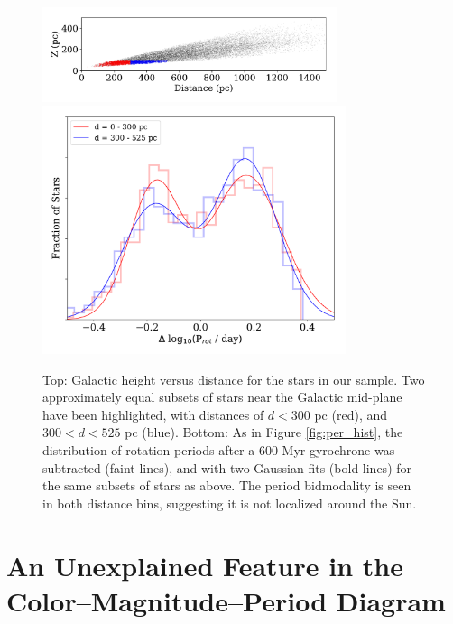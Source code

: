 \documentclass[trackchanges,preprint2]{aastex62}
\begin{document}
\begin{figure}[!ht]
\centering
\includegraphics[width=3.4in]{fig5a}
\includegraphics[width=3.5in]{fig5b}
\caption{
Top: Galactic height versus distance for the stars in our sample. Two approximately equal subsets of stars near the Galactic mid-plane have been highlighted, with distances of $d<300$ pc (red), and $300<d<525$ pc (blue).
Bottom: As in Figure \ref{fig:per_hist}, the distribution of rotation periods after a 600 Myr gyrochrone was subtracted (faint lines), and with two-Gaussian fits (bold lines) for the same subsets of stars as above. The period bidmodality is seen in both distance bins, suggesting it is not localized around the Sun.
}
\label{fig:dZ}
\end{figure}




\section{An Unexplained Feature in the Color--Magnitude--Period Diagram}
\label{sec:mystery}
\end{document}
